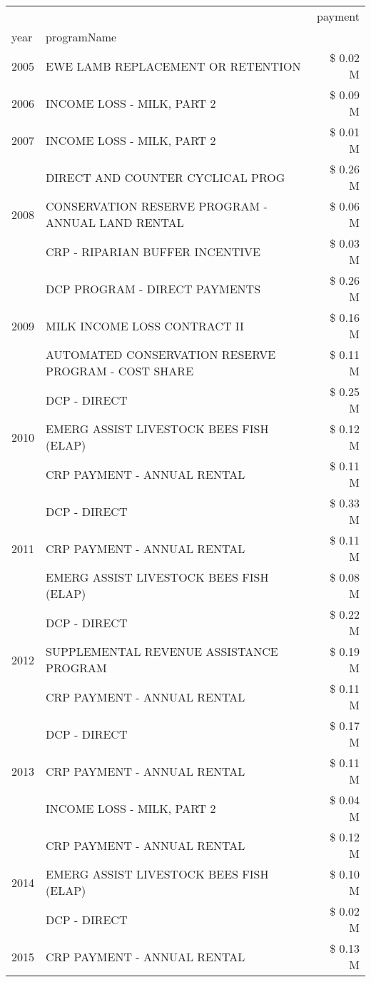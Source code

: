 \begin{tabular}{llr}
\toprule
 &  & payment \\
year & programName &  \\
\midrule
2005 & EWE LAMB REPLACEMENT OR RETENTION & \$ 0.02 M \\
\cline{1-3}
2006 & INCOME LOSS - MILK, PART 2 & \$ 0.09 M \\
\cline{1-3}
2007 & INCOME LOSS - MILK, PART 2 & \$ 0.01 M \\
\cline{1-3}
\multirow[t]{3}{*}{2008} & DIRECT AND COUNTER CYCLICAL PROG & \$ 0.26 M \\
 & CONSERVATION RESERVE PROGRAM - ANNUAL LAND RENTAL & \$ 0.06 M \\
 & CRP - RIPARIAN BUFFER INCENTIVE & \$ 0.03 M \\
\cline{1-3}
\multirow[t]{3}{*}{2009} & DCP PROGRAM - DIRECT PAYMENTS & \$ 0.26 M \\
 & MILK INCOME LOSS CONTRACT II & \$ 0.16 M \\
 & AUTOMATED CONSERVATION RESERVE PROGRAM - COST SHARE & \$ 0.11 M \\
\cline{1-3}
\multirow[t]{3}{*}{2010} & DCP - DIRECT & \$ 0.25 M \\
 & EMERG ASSIST LIVESTOCK BEES FISH (ELAP) & \$ 0.12 M \\
 & CRP PAYMENT - ANNUAL RENTAL & \$ 0.11 M \\
\cline{1-3}
\multirow[t]{3}{*}{2011} & DCP - DIRECT & \$ 0.33 M \\
 & CRP PAYMENT - ANNUAL RENTAL & \$ 0.11 M \\
 & EMERG ASSIST LIVESTOCK BEES FISH (ELAP) & \$ 0.08 M \\
\cline{1-3}
\multirow[t]{3}{*}{2012} & DCP - DIRECT & \$ 0.22 M \\
 & SUPPLEMENTAL REVENUE ASSISTANCE PROGRAM & \$ 0.19 M \\
 & CRP PAYMENT - ANNUAL RENTAL & \$ 0.11 M \\
\cline{1-3}
\multirow[t]{3}{*}{2013} & DCP - DIRECT & \$ 0.17 M \\
 & CRP PAYMENT - ANNUAL RENTAL & \$ 0.11 M \\
 & INCOME LOSS - MILK, PART 2 & \$ 0.04 M \\
\cline{1-3}
\multirow[t]{3}{*}{2014} & CRP PAYMENT - ANNUAL RENTAL & \$ 0.12 M \\
 & EMERG ASSIST LIVESTOCK BEES FISH (ELAP) & \$ 0.10 M \\
 & DCP - DIRECT & \$ 0.02 M \\
\cline{1-3}
\multirow[t]{3}{*}{2015} & CRP PAYMENT - ANNUAL RENTAL & \$ 0.13 M \\

\end{tabular}
